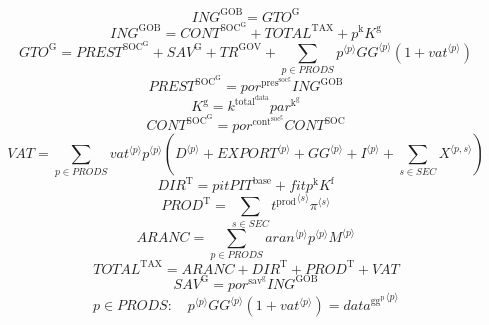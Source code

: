 \begin{equation}
{I\!N\!G}^{\mathrm{GOB}} = {G\!T\!O}^{\mathrm{G}}
\end{equation}
\begin{equation}
{I\!N\!G}^{\mathrm{GOB}} = {C\!O\!N\!T}^{\mathrm{SOC}^{\mathrm{G}}} + {T\!O\!T\!A\!L}^{\mathrm{TAX}} + {p^{\mathrm{k}}} {K^{\mathrm{g}}}
\end{equation}
\begin{equation}
{G\!T\!O}^{\mathrm{G}} = {P\!R\!E\!S\!T}^{\mathrm{SOC}^{\mathrm{G}}} + {S\!A\!V}^{\mathrm{G}} + {T\!R}^{\mathrm{GOV}} + \sum_{p\in {P\!R\!O\!D\!S}} {{p}^{\langle p\rangle}} {{{G\!G}}^{\langle p\rangle}} \left(1 + {{v\!a\!t}}^{\langle p\rangle}\right)
\end{equation}
\begin{equation}
{P\!R\!E\!S\!T}^{\mathrm{SOC}^{\mathrm{G}}} = {{p\!o\!r}^{\mathrm{pres}^{\mathrm{soc}^{\mathrm{g}}}}} {{I\!N\!G}^{\mathrm{GOB}}}
\end{equation}
\begin{equation}
K^{\mathrm{g}} = {k^{\mathrm{total}^{\mathrm{data}}}} {{p\!a\!r}^{\mathrm{k}^{\mathrm{g}}}}
\end{equation}
\begin{equation}
{C\!O\!N\!T}^{\mathrm{SOC}^{\mathrm{G}}} = {{p\!o\!r}^{\mathrm{cont}^{\mathrm{soc}^{\mathrm{g}}}}} {{C\!O\!N\!T}^{\mathrm{SOC}}}
\end{equation}
\begin{equation}
{V\!A\!T} = \sum_{p\in {P\!R\!O\!D\!S}} {{{v\!a\!t}}^{\langle p\rangle}} {{p}^{\langle p\rangle}} \left({D}^{\langle p\rangle} + {{E\!X\!P\!O\!R\!T}}^{\langle p\rangle} + {{G\!G}}^{\langle p\rangle} + {I}^{\langle p\rangle} + \sum_{s\in {S\!E\!C}} {X}^{\langle p,s\rangle}\right)
\end{equation}
\begin{equation}
{D\!I\!R}^{\mathrm{T}} = {{p\!i\!t}} {{P\!I\!T}^{\mathrm{base}}} + {{f\!i\!t}} {p^{\mathrm{k}}} {K^{\mathrm{f}}}
\end{equation}
\begin{equation}
{P\!R\!O\!D}^{\mathrm{T}} = \sum_{s\in {S\!E\!C}} {{t^{\mathrm{prod}}}^{\langle s\rangle}} {{\pi}^{\langle s\rangle}}
\end{equation}
\begin{equation}
{A\!R\!A\!N\!C} = \sum_{p\in {P\!R\!O\!D\!S}} {{{a\!r\!a\!n}}^{\langle p\rangle}} {{p}^{\langle p\rangle}} {{M}^{\langle p\rangle}}
\end{equation}
\begin{equation}
{T\!O\!T\!A\!L}^{\mathrm{TAX}} = {A\!R\!A\!N\!C} + {D\!I\!R}^{\mathrm{T}} + {P\!R\!O\!D}^{\mathrm{T}} + {V\!A\!T}
\end{equation}
\begin{equation}
{S\!A\!V}^{\mathrm{G}} = {{p\!o\!r}^{\mathrm{sav}^{\mathrm{g}}}} {{I\!N\!G}^{\mathrm{GOB}}}
\end{equation}
\begin{equation}
p\in {P\!R\!O\!D\!S}\colon\quad {{p}^{\langle p\rangle}} {{{G\!G}}^{\langle p\rangle}} \left(1 + {{v\!a\!t}}^{\langle p\rangle}\right) = {{d\!a\!t\!a}^{\mathrm{gg}^{\mathrm{p}}}}^{\langle p\rangle}
\end{equation}




